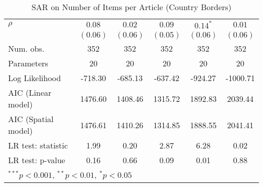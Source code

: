 \begin{table}[!h]
\begin{center}
\begin{tabular}{l c c c c c }
$\rho$                  & $0.08$       & $0.02$       & $0.09$       & $0.14^{*}$   & $0.01$       \\
                        & $(0.06)$     & $(0.06)$     & $(0.05)$     & $(0.06)$     & $(0.06)$     \\
\midrule
Num. obs.               & 352          & 352          & 352          & 352          & 352          \\
Parameters              & 20           & 20           & 20           & 20           & 20           \\
Log Likelihood          & -718.30      & -685.13      & -637.42      & -924.27      & -1000.71     \\
AIC (Linear model)      & 1476.60      & 1408.46      & 1315.72      & 1892.83      & 2039.44      \\
AIC (Spatial model)     & 1476.61      & 1410.26      & 1314.85      & 1888.55      & 2041.41      \\
LR test: statistic      & 1.99         & 0.20         & 2.87         & 6.28         & 0.02         \\
LR test: p-value        & 0.16         & 0.66         & 0.09         & 0.01         & 0.88         \\
\bottomrule
\multicolumn{6}{l}{\scriptsize{$^{***}p<0.001$, $^{**}p<0.01$, $^*p<0.05$}}
\end{tabular}
\caption{SAR on Number of Items per Article (Country Borders)}
\label{table:coefficients}
\end{center}
\end{table}
